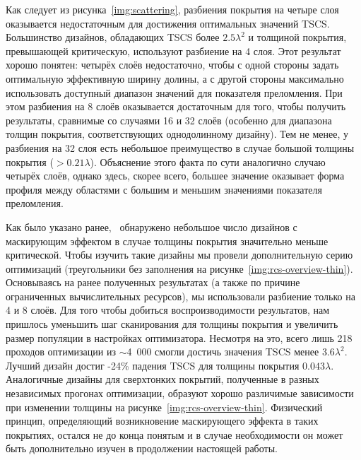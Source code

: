 Как следует из рисунка~\ref{img:scattering}, разбиения покрытия на
четыре слоя оказывается недостаточным для достижения оптимальных
значений TSCS.  Большинство дизайнов, обладающих TSCS более
$2.5\lambda^2$ и толщиной покрытия, превышающей критическую,
используют разбиение на 4 слоя.  Этот результат хорошо понятен:
четырёх слоёв недостаточно, чтобы с одной стороны задать оптимальную
эффективную ширину долины, а с другой стороны максимально использовать
доступный диапазон значений для показателя преломления.  При этом
разбиения на 8 слоёв оказывается достаточным для того, чтобы получить
результаты, сравнимые со случаями 16 и 32 слоёв (особенно для
диапазона толщин покрытия, соответствующих однодолинному дизайну).
Тем не менее, у разбиения на 32 слоя есть небольшое преимущество в
случае большой толщины покрытия (${> 0.21\lambda}$). Объяснение этого
факта по сути аналогично случаю четырёх слоёв, однако здесь, скорее
всего, большее значение оказывает форма профиля между областями с
большим и меньшим значениями показателя преломления.
\begin{figure}
\end{figure}

Как было указано ранее,~\label{ref:thin-designs} обнаружено небольшое
число дизайнов с маскирующим эффектом в случае толщины покрытия
значительно меньше критической.  Чтобы изучить такие дизайны мы
провели дополнительную серию оптимизаций (треугольники без заполнения
на рисунке~\ref{img:rcs-overview-thin}).  Основываясь на ранее
полученных результатах (а также по причине ограниченных вычислительных
ресурсов), мы использовали разбиение только на 4 и 8 слоёв.  Для того
чтобы добиться воспроизводимости результатов, нам пришлось уменьшить
шаг сканирования для толщины покрытия и увеличить размер популяции в
настройках оптимизатора.  Несмотря на это, всего лишь 218 проходов
оптимизации из $\sim$4~000 смогли достичь значения TSCS менее
$3.6\lambda^2$.  Лучший дизайн достиг -24\% падения TSCS для толщины
покрытия $0.043\lambda$.  Аналогичные дизайны для сверхтонких
покрытий, полученные в разных независимых прогонах оптимизации,
образуют хорошо различимые зависимости при изменении толщины на
рисунке~\ref{img:rcs-overview-thin}.  Физический принцип, определяющий
возникновение маскирующего эффекта в таких покрытиях, остался не до
конца понятым и в случае необходимости он может быть дополнительно
изучен в продолжении настоящей работы.


